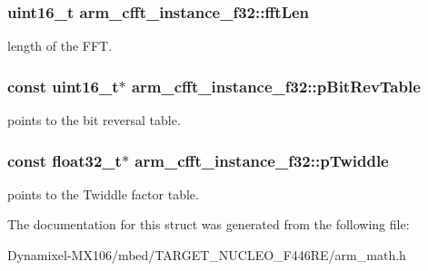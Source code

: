 \subsubsection[{\texorpdfstring{fft\+Len}{fftLen}}]{\setlength{\rightskip}{0pt plus 5cm}uint16\+\_\+t arm\+\_\+cfft\+\_\+instance\+\_\+f32\+::fft\+Len}\hypertarget{structarm__cfft__instance__f32_acd8f9e9540e3dd348212726e5d6aaa95}{}\label{structarm__cfft__instance__f32_acd8f9e9540e3dd348212726e5d6aaa95}
length of the F\+FT. 
\subsubsection[{\texorpdfstring{p\+Bit\+Rev\+Table}{pBitRevTable}}]{\setlength{\rightskip}{0pt plus 5cm}const uint16\+\_\+t$\ast$ arm\+\_\+cfft\+\_\+instance\+\_\+f32\+::p\+Bit\+Rev\+Table}\hypertarget{structarm__cfft__instance__f32_a21ceaf59a1bb8440af57c28d2dd9bbab}{}\label{structarm__cfft__instance__f32_a21ceaf59a1bb8440af57c28d2dd9bbab}
points to the bit reversal table. 
\subsubsection[{\texorpdfstring{p\+Twiddle}{pTwiddle}}]{\setlength{\rightskip}{0pt plus 5cm}const float32\+\_\+t$\ast$ arm\+\_\+cfft\+\_\+instance\+\_\+f32\+::p\+Twiddle}\hypertarget{structarm__cfft__instance__f32_a59cc6f753f1498716e1444ac054c06de}{}\label{structarm__cfft__instance__f32_a59cc6f753f1498716e1444ac054c06de}
points to the Twiddle factor table. 

The documentation for this struct was generated from the following file\+:\begin{DoxyCompactItemize}
\item 
Dynamixel-\/\+M\+X106/mbed/\+T\+A\+R\+G\+E\+T\+\_\+\+N\+U\+C\+L\+E\+O\+\_\+\+F446\+R\+E/arm\+\_\+math.\+h\end{DoxyCompactItemize}
